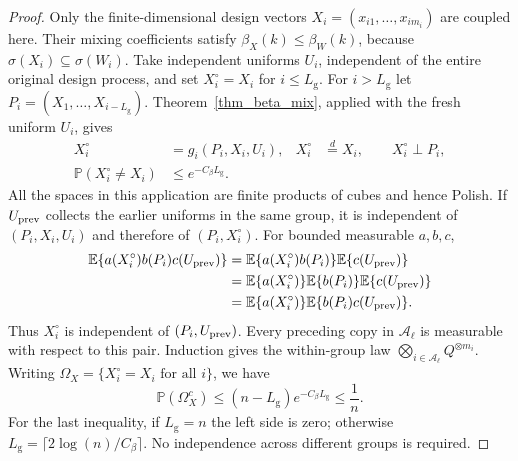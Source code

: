 \documentclass[twoside,11pt]{article}
\newenvironment{revision}{\color{revisionred}}{}
\begin{document}
\begin{revision}
\begin{proof}
Only the finite-dimensional design vectors
$X_i=(x_{i1},\ldots,x_{im_i})$ are coupled here.
Their mixing coefficients satisfy $\beta_X(k)\leq\beta_W(k)$,
because $\sigma(X_i)\subseteq\sigma(W_i)$.
Take independent uniforms $U_i$, independent of the entire original
design process, and set $X_i^\circ=X_i$ for $i\leq L_{\mathrm g}$.
For $i>L_{\mathrm g}$ let $P_i=(X_1,\ldots,X_{i-L_{\mathrm g}})$.
Theorem~\ref{thm_beta_mix}, applied with the fresh uniform $U_i$,
gives
\begin{equation}
\label{eq_knn_design_coupling}
\begin{aligned}
X_i^\circ&=g_i(P_i,X_i,U_i),&
X_i^\circ&\stackrel d=X_i,\qquad X_i^\circ\perp P_i,\\
\mathbb P(X_i^\circ\ne X_i)
&\leq e^{-C_\beta L_{\mathrm g}}.
\end{aligned}
\end{equation}
All the spaces in this application are finite products of cubes
and hence Polish. If $U_{\rm prev}$ collects the earlier uniforms
in the same group, it is independent of $(P_i,X_i,U_i)$ and
therefore of $(P_i,X_i^\circ)$. For bounded measurable $a,b,c$,
\begin{align*}
\mathbb E\{a(X_i^\circ)b(P_i)c(U_{\rm prev})\}
&=\mathbb E\{a(X_i^\circ)b(P_i)\}
  \mathbb E\{c(U_{\rm prev})\}\\
&=\mathbb E\{a(X_i^\circ)\}
  \mathbb E\{b(P_i)\}\mathbb E\{c(U_{\rm prev})\}\\
&=\mathbb E\{a(X_i^\circ)\}
  \mathbb E\{b(P_i)c(U_{\rm prev})\}.
\end{align*}
Thus $X_i^\circ$ is independent of $(P_i,U_{\rm prev})$.
Every preceding copy in $\mathcal A_\ell$ is measurable with respect
to this pair. Induction gives the within-group law
$\bigotimes_{i\in\mathcal A_\ell}Q^{\otimes m_i}$.
Writing $\Omega_X=\{X_i^\circ=X_i\text{ for all }i\}$, we have
\begin{equation}
\label{eq_knn_design_matching}
\mathbb P(\Omega_X^c)
\leq(n-L_{\mathrm g})e^{-C_\beta L_{\mathrm g}}\leq\frac1n.
\end{equation}
For the last inequality, if $L_{\mathrm g}=n$ the left side is
zero; otherwise $L_{\mathrm g}=\lceil2\log(n)/C_\beta\rceil$.
No independence across different groups is required.


\end{proof}
\end{revision}
\end{document}
